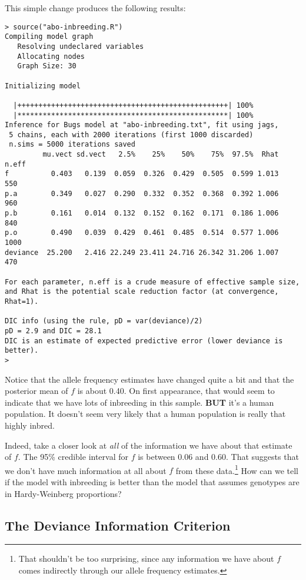 This simple change produces the following results:
\begin{verbatim}
> source("abo-inbreeding.R")
Compiling model graph
   Resolving undeclared variables
   Allocating nodes
   Graph Size: 30

Initializing model

  |++++++++++++++++++++++++++++++++++++++++++++++++++| 100%
  |**************************************************| 100%
Inference for Bugs model at "abo-inbreeding.txt", fit using jags,
 5 chains, each with 2000 iterations (first 1000 discarded)
 n.sims = 5000 iterations saved
         mu.vect sd.vect   2.5%    25%    50%    75%  97.5%  Rhat n.eff
f          0.403   0.139  0.059  0.326  0.429  0.505  0.599 1.013   550
p.a        0.349   0.027  0.290  0.332  0.352  0.368  0.392 1.006   960
p.b        0.161   0.014  0.132  0.152  0.162  0.171  0.186 1.006   840
p.o        0.490   0.039  0.429  0.461  0.485  0.514  0.577 1.006  1000
deviance  25.200   2.416 22.249 23.411 24.716 26.342 31.206 1.007   470

For each parameter, n.eff is a crude measure of effective sample size,
and Rhat is the potential scale reduction factor (at convergence, Rhat=1).

DIC info (using the rule, pD = var(deviance)/2)
pD = 2.9 and DIC = 28.1
DIC is an estimate of expected predictive error (lower deviance is better).
>
\end{verbatim}
Notice that the allele frequency estimates have changed quite a bit
and that the posterior mean of $f$ is about 0.40. On first appearance,
that would seem to indicate that we have lots of inbreeding in this
sample. {\bf BUT} it's a human population. It doesn't seem very
likely that a human population is really that highly inbred.

Indeed, take a closer look at {\it all\/} of the information we have
about that estimate of $f$. The 95\% credible interval for $f$ is
between 0.06 and 0.60. That suggests that we don't have much
information at all about $f$ from these data.\footnote{That shouldn't
  be too surprising, since any information we have about $f$ comes
  indirectly through our allele frequency estimates.} How can we tell
if the model with inbreeding is better than the model that assumes
genotypes are in Hardy-Weinberg proportions?

\subsection*{The Deviance Information Criterion}

